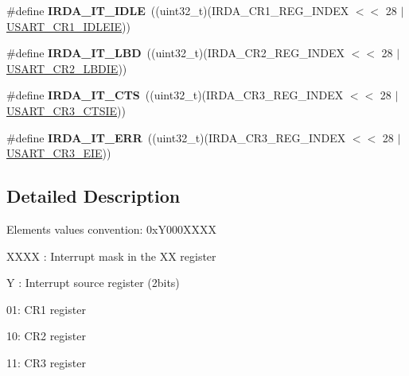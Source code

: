 \begin{DoxyCompactItemize}
\item 
\#define {\bfseries I\+R\+D\+A\+\_\+\+I\+T\+\_\+\+I\+D\+LE}~((uint32\+\_\+t)(I\+R\+D\+A\+\_\+\+C\+R1\+\_\+\+R\+E\+G\+\_\+\+I\+N\+D\+EX $<$$<$ 28 $\vert$ \hyperlink{group___peripheral___registers___bits___definition_ga5221d09eebd12445a20f221bf98066f8}{U\+S\+A\+R\+T\+\_\+\+C\+R1\+\_\+\+I\+D\+L\+E\+IE}))\hypertarget{group___i_r_d_a___interrupt__definition_ga32dfb69029c5576d82feb59129d11000}{}\label{group___i_r_d_a___interrupt__definition_ga32dfb69029c5576d82feb59129d11000}

\item 
\#define {\bfseries I\+R\+D\+A\+\_\+\+I\+T\+\_\+\+L\+BD}~((uint32\+\_\+t)(I\+R\+D\+A\+\_\+\+C\+R2\+\_\+\+R\+E\+G\+\_\+\+I\+N\+D\+EX $<$$<$ 28 $\vert$ \hyperlink{group___peripheral___registers___bits___definition_gaa02ef5d22553f028ea48e5d9f08192b4}{U\+S\+A\+R\+T\+\_\+\+C\+R2\+\_\+\+L\+B\+D\+IE}))\hypertarget{group___i_r_d_a___interrupt__definition_ga2d08dacfa9795cec98fa67f91a29ba53}{}\label{group___i_r_d_a___interrupt__definition_ga2d08dacfa9795cec98fa67f91a29ba53}

\item 
\#define {\bfseries I\+R\+D\+A\+\_\+\+I\+T\+\_\+\+C\+TS}~((uint32\+\_\+t)(I\+R\+D\+A\+\_\+\+C\+R3\+\_\+\+R\+E\+G\+\_\+\+I\+N\+D\+EX $<$$<$ 28 $\vert$ \hyperlink{group___peripheral___registers___bits___definition_ga636d5ec2e9556949fc68d13ad45a1e90}{U\+S\+A\+R\+T\+\_\+\+C\+R3\+\_\+\+C\+T\+S\+IE}))\hypertarget{group___i_r_d_a___interrupt__definition_gaf74d3cd0cf4b22c53718a267ae9a1174}{}\label{group___i_r_d_a___interrupt__definition_gaf74d3cd0cf4b22c53718a267ae9a1174}

\item 
\#define {\bfseries I\+R\+D\+A\+\_\+\+I\+T\+\_\+\+E\+RR}~((uint32\+\_\+t)(I\+R\+D\+A\+\_\+\+C\+R3\+\_\+\+R\+E\+G\+\_\+\+I\+N\+D\+EX $<$$<$ 28 $\vert$ \hyperlink{group___peripheral___registers___bits___definition_gaaed1a39c551b1641128f81893ff558d0}{U\+S\+A\+R\+T\+\_\+\+C\+R3\+\_\+\+E\+IE}))\hypertarget{group___i_r_d_a___interrupt__definition_ga5649210cc5343a80483178849a11ac66}{}\label{group___i_r_d_a___interrupt__definition_ga5649210cc5343a80483178849a11ac66}

\end{DoxyCompactItemize}


\subsection{Detailed Description}
Elements values convention\+: 0x\+Y000\+X\+X\+XX
\begin{DoxyItemize}
\item X\+X\+XX \+: Interrupt mask in the XX register
\item Y \+: Interrupt source register (2bits)
\begin{DoxyItemize}
\item 01\+: C\+R1 register
\item 10\+: C\+R2 register
\item 11\+: C\+R3 register 
\end{DoxyItemize}
\end{DoxyItemize}